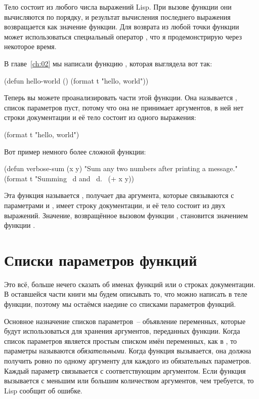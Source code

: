 Тело  состоит из любого числа выражений Lisp.  При вызове функции они
вычисляются по порядку, и результат вычисления последнего выражения возвращается как
значение функции.  Для возврата из любой точки функции может использоваться специальный
оператор , что я продемонстрирую через некоторое время.

В главе~\ref{ch:02} мы написали функцию , которая выглядела вот так:

\begin{myverb}
  (defun hello-world () (format t "hello, world"))
\end{myverb}

Теперь вы можете проанализировать части этой функции.  Она называется ,
список параметров пуст, потому что она не принимает аргументов, в ней нет строки
документации и её тело состоит из одного выражения:

\begin{myverb}
  (format t "hello, world")
\end{myverb}

Вот пример немного более сложной функции:

\begin{myverb}
  (defun verbose-sum (x y)
    "Sum any two numbers after printing a message."
    (format t "Summing ~d and ~d.~%
    (+ x y))
\end{myverb}

Эта функция называется , получает два аргумента, которые связываются с
параметрами  и , имеет строку документации, и её тело состоит из двух
выражений.  Значение, возвращённое вызовом функции \code{+}, становится значением функции
.

\section{Списки параметров функций}

Это всё, больше нечего сказать об именах функций или о строках документации. В оставшейся
части книги мы будем описывать то, что можно написать в теле функции, поэтому мы остаёмся
наедине со списками параметров функций.

Основное назначение списков параметров~-- объявление переменных, которые будут
использоваться для хранения аргументов, переданных функции.  Когда список параметров
является простым списком имён переменных, как в , то параметры
называются \textit{обязательными}.  Когда функция вызывается, она должна получить ровно по
одному аргументу для каждого из обязательных параметров.  Каждый параметр связывается с
соответствующим аргументом.  Если функция вызывается с меньшим или большим количеством
аргументов, чем требуется, то Lisp сообщит об ошибке.

